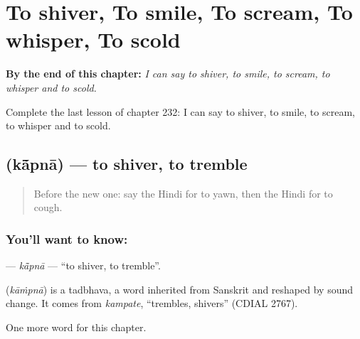 
\chapter{To shiver, To smile, To scream, To whisper, To scold}
\label{ch:hi-to-shiver-to-smile-to-scream-to-whisper-to-scold}

\begin{chapteropening}
\textbf{By the end of this chapter:} \emph{I can say to shiver, to smile, to scream, to whisper and to scold.}

Complete the last lesson of chapter 232: I can say to shiver, to smile, to scream, to whisper and to scold.
\end{chapteropening}

\section[\texorpdfstring{\hi{काँपना} (kā̃pnā)}{काँपना (kā̃pnā)}]{ (kā̃pnā) — to shiver, to tremble}

\label{lesson:HI-C232-kapna}



\begin{quote}
Before the new one: say the Hindi for to yawn, then the Hindi for to cough.
\end{quote}

\subsection*{You'll want to know: }
\textbf{} — \emph{kā̃pnā} — \textquotedblleft{}to shiver, to tremble\textquotedblright{}.

\begin{cousinweb}
\textbf{} (\emph{kāṁpnā}) is a tadbhava, a word inherited from Sanskrit and reshaped by sound change. It comes from \emph{kampate}, \textquotedblleft{}trembles, shivers\textquotedblright{} (CDIAL 2767).
\end{cousinweb}

\begin{grammarlens}[title={What you've built}]
One more word for this chapter.
\end{grammarlens}

